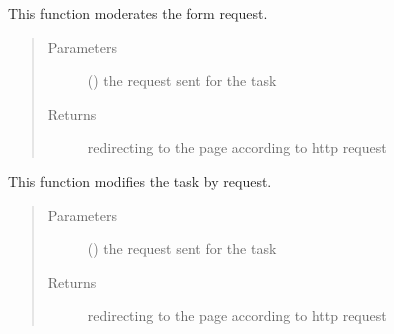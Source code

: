 \documentclass[letterpaper,10pt,english]{sphinxmanual}
\begin{document}
\begin{fulllineitems}
\label{\detokenize{janta:janta.views.moderator_home}}
This function moderates the form request.
\begin{quote}\begin{description}
\item[{Parameters}] \leavevmode
{} () \textendash{} the request sent for the task

\item[{Returns}] \leavevmode
redirecting to the page according to http request

\end{description}\end{quote}

\end{fulllineitems}


\begin{fulllineitems}
\label{\detokenize{janta:janta.views.modify_task}}
This function modifies the task by request.
\begin{quote}\begin{description}
\item[{Parameters}] \leavevmode
{} () \textendash{} the request sent for the task

\item[{Returns}] \leavevmode
redirecting to the page according to http request

\end{description}\end{quote}

\end{fulllineitems}

\end{document}
